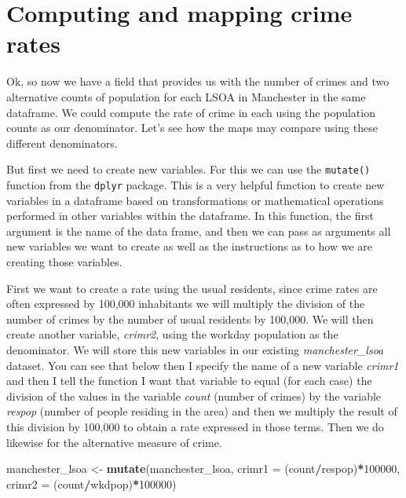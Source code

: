 \documentclass[]{book}
\newenvironment{Shaded}{\begin{snugshade}}{\end{snugshade}}
\newcommand{\DataTypeTok}[1]{\textcolor[rgb]{0.13,0.29,0.53}{#1}}
\newcommand{\DecValTok}[1]{\textcolor[rgb]{0.00,0.00,0.81}{#1}}
\newcommand{\KeywordTok}[1]{\textcolor[rgb]{0.13,0.29,0.53}{\textbf{#1}}}
\newcommand{\NormalTok}[1]{#1}
\newcommand{\OperatorTok}[1]{\textcolor[rgb]{0.81,0.36,0.00}{\textbf{#1}}}
\newcommand{\StringTok}[1]{\textcolor[rgb]{0.31,0.60,0.02}{#1}}
\begin{document}
\hypertarget{computing-and-mapping-crime-rates}{%
\section{Computing and mapping crime rates}\label{computing-and-mapping-crime-rates}}

Ok, so now we have a field that provides us with the number of crimes and two alternative counts of population for each LSOA in Manchester in the same dataframe. We could compute the rate of crime in each using the population counts as our denominator. Let's see how the maps may compare using these different denominators.

But first we need to create new variables. For this we can use the \texttt{mutate()} function from the \texttt{dplyr} package. This is a very helpful function to create new variables in a dataframe based on transformations or mathematical operations performed in other variables within the dataframe. In this function, the first argument is the name of the data frame, and then we can pass as arguments all new variables we want to create as well as the instructions as to how we are creating those variables.

First we want to create a rate using the usual residents, since crime rates are often expressed by 100,000 inhabitants we will multiply the division of the number of crimes by the number of usual residents by 100,000. We will then create another variable, \emph{crimr2}, using the workday population as the denominator. We will store this new variables in our existing \emph{manchester\_lsoa} dataset. You can see that below then I specify the name of a new variable \emph{crimr1} and then I tell the function I want that variable to equal (for each case) the division of the values in the variable \emph{count} (number of crimes) by the variable \emph{respop} (number of people residing in the area) and then we multiply the result of this division by 100,000 to obtain a rate expressed in those terms. Then we do likewise for the alternative measure of crime.

\begin{Shaded}
\begin{Highlighting}[]
\NormalTok{manchester_lsoa <-}\StringTok{ }\KeywordTok{mutate}\NormalTok{(manchester_lsoa, }\DataTypeTok{crimr1 =}\NormalTok{ (count}\OperatorTok{/}\NormalTok{respop)}\OperatorTok{*}\DecValTok{100000}\NormalTok{, }\DataTypeTok{crimr2 =}\NormalTok{ (count}\OperatorTok{/}\NormalTok{wkdpop)}\OperatorTok{*}\DecValTok{100000}\NormalTok{)}
\end{Highlighting}
\end{Shaded}
\end{document}
